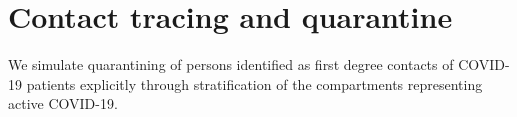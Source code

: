\section{Contact tracing and quarantine}
We simulate quarantining of persons identified as first degree contacts of COVID-19 patients explicitly through stratification of the compartments representing active COVID-19.
